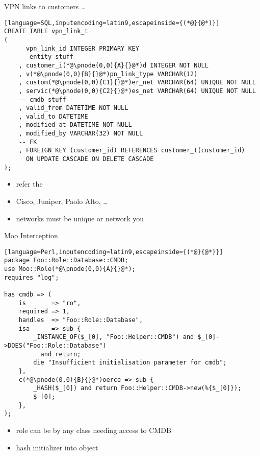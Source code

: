 \documentclass[ngerman,xcolor={table,dvipsnames},smaller,compress,hyperref={bookmarks,colorlinks}]{beamer}%
\begin{document}
\begin{frame}[fragile]{}
\begin{block}{VPN links to customers \ldots}
\scriptsize
\begin{lstlisting}[language=SQL,inputencoding=latin9,escapeinside={(*@}{@*)}]
CREATE TABLE vpn_link_t
(
      vpn_link_id INTEGER PRIMARY KEY
    -- entity stuff
    , customer_i(*@\pnode(0,0){A}{}@*)d INTEGER NOT NULL
    , v(*@\pnode(0,0){B}{}@*)pn_link_type VARCHAR(12)
    , custom(*@\pnode(0,0){C1}{}@*)er_net VARCHAR(64) UNIQUE NOT NULL
    , servic(*@\pnode(0,0){C2}{}@*)es_net VARCHAR(64) UNIQUE NOT NULL
    -- cmdb stuff
    , valid_from DATETIME NOT NULL
    , valid_to DATETIME
    , modified_at DATETIME NOT NULL
    , modified_by VARCHAR(32) NOT NULL
    -- FK
    , FOREIGN KEY (customer_id) REFERENCES customer_t(customer_id)
      ON UPDATE CASCADE ON DELETE CASCADE
);
\end{lstlisting}
\end{block}

\begin{itemize}
\item<2-> refer the 
\item<3->  Cisco, Juniper, Paolo Alto, \ldots
\item<4-> networks must be unique or network  you
\end{itemize}
\end{frame}

\begin{frame}[fragile]{}
\begin{block}{Moo Interception}
\scriptsize
\begin{lstlisting}[language=Perl,inputencoding=latin9,escapeinside={(*@}{@*)}]
package Foo::Role::Database::CMDB;
use Moo::Role(*@\pnode(0,0){A}{}@*);
requires "log";

has cmdb => (
    is       => "ro",
    required => 1,
    handles  => "Foo::Role::Database",
    isa      => sub {
        _INSTANCE_OF($_[0], "Foo::Helper::CMDB") and $_[0]->DOES("Foo::Role::Database")
          and return;
        die "Insufficient initialisation parameter for cmdb";
    },
    c(*@\pnode(0,0){B}{}@*)oerce => sub {
        _HASH($_[0]) and return Foo::Helper::CMDB->new(%{$_[0]});
        $_[0];
    },
);
\end{lstlisting}
\end{block}

\begin{itemize}
\item<2-> role can be  by any class needing access to CMDB
\item<3->  hash initializer into object
\end{itemize}
\end{frame}
\end{document}
